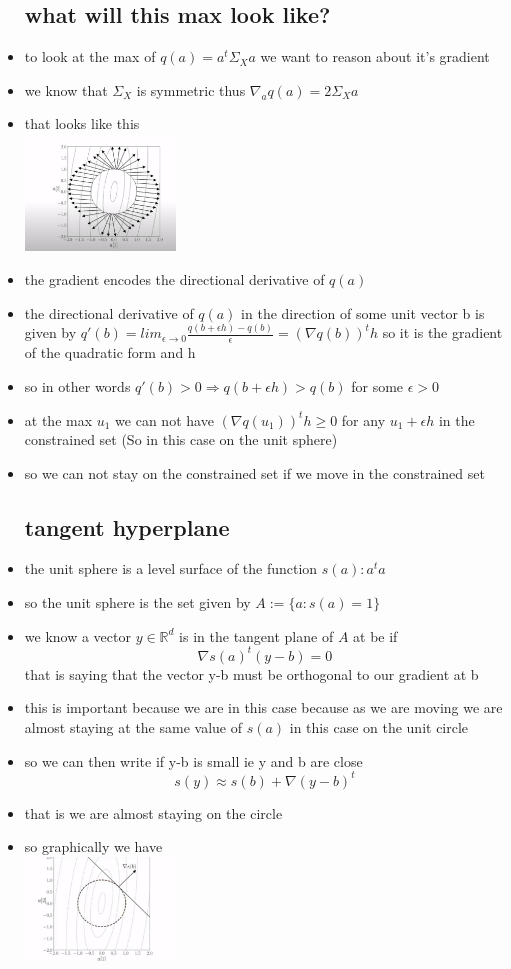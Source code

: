 \documentclass{article}
\begin{document}
\begin{itemize}
\subsection*{what will this max look like?}
\item to look at the max of $q(a)=a^t\Sigma_{X}a$ we want to reason about it's gradient 
\item we know that $\Sigma_{X}$ is symmetric thus $\nabla_{a}q(a)=2\Sigma_{X}a$
\item that looks like this\\ \includegraphics[width=4cm]{notes/week_8/Vedio_3/immages/v3_3.png}
\item the gradient encodes the directional derivative of $q(a)$
\item the directional derivative of $q(a)$ in the direction of some unit vector b is given by 
$q'(b)=lim_{\epsilon\rightarrow 0}\frac{q(b+\epsilon h)-q(b)}{\epsilon}=(\nabla q(b))^th$ so it is the gradient of the quadratic form and h 
\item so in other words $q'(b)>0 \Rightarrow q(b+\epsilon h)>q(b)$ for some $\epsilon>0$
\item  at the max $u_1$ we can not have $(\nabla q(u_1))^{t}h\geq 0$ for any $u_1+\epsilon h$ in the constrained set (So in this case on the unit sphere)
\item so we can not stay on the constrained set if we move in the constrained set 
\subsection*{tangent hyperplane}
\item the unit sphere is a level surface of the function $s(a):a^ta$
\item so the unit sphere is the set given by $A:=\{a:s(a)=1\}$
\item we know a vector $y\in \mathbb{R}^{d}$ is in the tangent plane of $A$ at be if $$\nabla s(a)^{t}(y-b)=0$$ that is saying that the vector y-b must be orthogonal to our gradient at b 
\item this is important because we are in this case because as we are moving we are almost staying at the same value of $s(a)$ in this case on the unit circle
\item so we can then write if y-b is small ie y and b are close $$s(y)\approx s(b)+\nabla(y-b)^{t}$$
\item that is we are almost staying on the circle
\item so graphically we have \\ \includegraphics*[width=4cm]{notes/week_8/Vedio_3/immages/v3_4.png}

\end{itemize}
\end{document}
